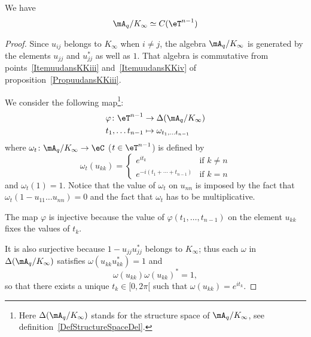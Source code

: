 \begin{proposition}
    We have
    \begin{equation}
        \mA_q/K_{\infty}\simeq C(\eT^{n-1})
    \end{equation}

\end{proposition}

\begin{proof}
    Since $u_{ij}$ belongs to $K_{\infty}$ when $i\neq j$, the algebra $\mA_q/K_{\infty}$ is generated by the elements $u_{jj}$ and $u_{jj}^*$ as well as $1$. That algebra is commutative from points~\ref{ItemuudansKKiii} and~\ref{ItemuudansKKiv} of proposition~\ref{PropuudansKKiii}.

    We consider the following map\footnote{Here $\Delta(\mA_q/K_{\infty})$ stands for the structure space of $\mA_q/K_{\infty}$, see definition~\ref{DefStructureSpaceDel}.}:
    \begin{equation}
        \begin{aligned}
            \varphi\colon \eT^{n-1}&\to \Delta(\mA_q/K_{\infty}) \\
            t_1,\ldots t_{n-1}&\mapsto \omega_{t_1,\ldots t_{n-1}}
        \end{aligned}
    \end{equation}
    where $\omega_t\colon \mA_q/K_{\infty}\to \eC$ ($t\in\eT^{n-1}$) is defined by
    \begin{equation}
        \omega_t(u_{kk})=\begin{cases}
            e^{it_k}    &   \text{if }k\neq n\\
            e^{-i(t_1+\cdots+t_{n-1})}  &    \text{if }k=n
        \end{cases}
    \end{equation}
    and $\omega_t(1)=1$. Notice that the value of $\omega_t$ on $u_{nn}$ is imposed by the fact that $\omega_t(1-u_{11}\ldots u_{nn})=0$ and the fact that $\omega_t$ has to be multiplicative.

    The map $\varphi$ is injective because the value of $\varphi(t_1,\ldots,t_{n-1})$ on the element $u_{kk}$ fixes the values of $t_k$.

    It is also surjective because $1-u_{jj}u_{jj}^*$ belongs to $K_{\infty}$; thus each $\omega$ in $\Delta(\mA_q/K_{\infty})$ satisfies $\omega(u_{kk}u_{kk}^*)=1$ and
    \begin{equation}
        \omega(u_{kk})\omega(u_{kk})^*=1,
    \end{equation}
    so that there exists a unique $t_k\in\mathopen[ 0 , 2\pi [$ such that $\omega(u_{kk})= e^{it_k}$.


\end{proof}
